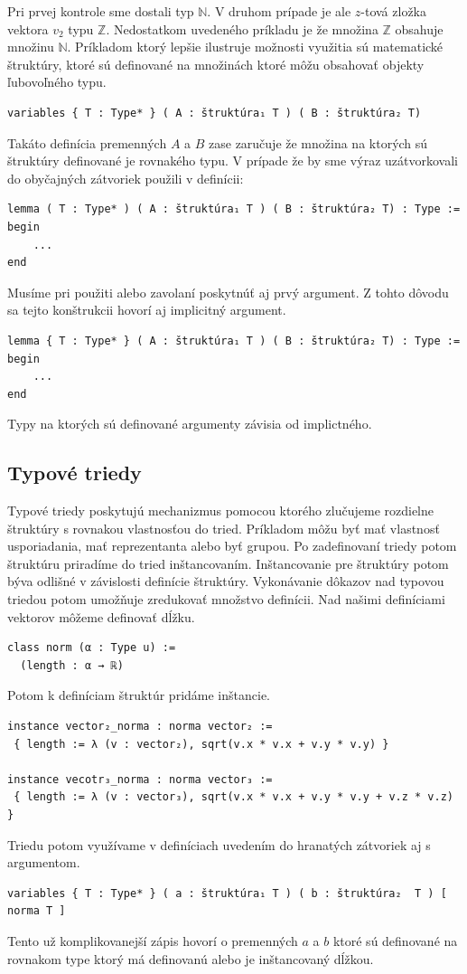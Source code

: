 \documentclass[a4paper,10pt,oneside]{report}%
\begin{document}
    Pri prvej kontrole sme dostali typ $\mathbb{N}$.
    V druhom prípade je ale $z$-tová zložka vektora $v_{2}$ typu $\mathbb{Z}$.
    Nedostatkom uvedeného príkladu je že množina $\mathbb{Z}$ obsahuje
množinu $\mathbb{N}$.
    Príkladom ktorý lepšie ilustruje možnosti využitia sú matematické štruktúry,
ktoré sú definované na množinách ktoré môžu obsahovať objekty ľubovoľného typu.
\begin{lstlisting}
variables { T : Type* } ( A : štruktúra₁ T ) ( B : štruktúra₂ T)
\end{lstlisting}
    Takáto definícia premenných $A$ a $B$ zase zaručuje že množina na ktorých sú
štruktúry definované je rovnakého typu.
    V prípade že by sme výraz uzátvorkovali do obyčajných zátvoriek použili v
definícii:
\begin{lstlisting}
lemma ( T : Type* ) ( A : štruktúra₁ T ) ( B : štruktúra₂ T) : Type :=
begin
    ...
end
\end{lstlisting}
    Musíme pri použiti alebo zavolaní poskytnúť aj prvý argument.
    Z tohto dôvodu sa tejto konštrukcii hovorí aj implicitný argument.
\begin{lstlisting}
lemma { T : Type* } ( A : štruktúra₁ T ) ( B : štruktúra₂ T) : Type :=
begin
    ...
end
\end{lstlisting}
Typy na ktorých sú definované argumenty závisia od implictného.
\subsection{Typové triedy}
    Typové triedy poskytujú mechanizmus pomocou ktorého zlučujeme rozdielne štruktúry
s rovnakou vlastnosťou do tried.
    Príkladom môžu byť mať vlastnosť usporiadania, mať reprezentanta alebo
byť grupou.
    Po zadefinovaní triedy potom štruktúru priradíme do tried inštancovaním.
    Inštancovanie pre štruktúry potom býva odlišné v závislosti definície štruktúry.
    Vykonávanie dôkazov nad typovou triedou potom umožňuje zredukovať množstvo definícii.
    Nad našimi definíciami vektorov môžeme definovať dĺžku.
\begin{lstlisting}
class norm (α : Type u) :=
  (length : α → ℝ)
\end{lstlisting}
    Potom k definíciam štruktúr pridáme inštancie.
\begin{lstlisting}
instance vector₂_norma : norma vector₂ :=
 { length := λ (v : vector₂), sqrt(v.x * v.x + v.y * v.y) }

instance vecotr₃_norma : norma vector₃ :=
 { length := λ (v : vector₃), sqrt(v.x * v.x + v.y * v.y + v.z * v.z) }
\end{lstlisting}
    Triedu potom využívame v definíciach uvedením do hranatých zátvoriek aj s
argumentom.
\begin{lstlisting}
variables { T : Type* } ( a : štruktúra₁ T ) ( b : štruktúra₂  T ) [ norma T ]
\end{lstlisting}
    Tento už komplikovanejší zápis hovorí o premenných $a$ a $b$ ktoré sú definované
na rovnakom type ktorý má definovanú alebo je inštancovaný dĺžkou.
\end{document}
